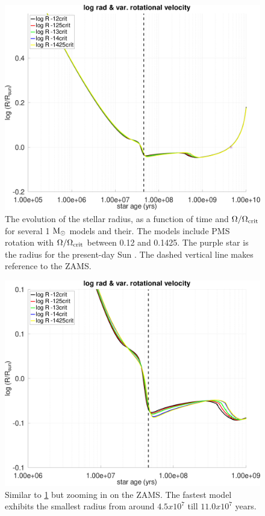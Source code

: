 \documentclass[fleqn,usenatbib]{mnras}
\begin{document}
\begin{ceqn}
\begin{figure}
	\includegraphics[clip,width=\columnwidth]{figures/paper2/lograd_var_vel_g3.pdf}
    \caption{The evolution of the stellar radius, as a function of time and $\Omega / \Omega_{\mathrm{crit}}$ for several 1 $\mathrm{M}_\odot$ models and their. The models include PMS rotation with $\Omega / \Omega_{\mathrm{crit}}$ between 0.12 and 0.1425. The purple star is the radius for the present-day Sun \citep{Gill2012}. The dashed vertical line makes reference to the ZAMS.}
    \label{fig:lograd_var_vel_g3}
\end{figure}

\begin{figure}
	\includegraphics[clip,width=\columnwidth]{figures/paper2/lograd_var_vel_g_z13.pdf}
    \caption{Similar to \ref{fig:lograd_var_vel_g3} but zooming in on the ZAMS. The fastest model exhibits the smallest radius from around $4.5x10^{7}$ till $11.0x10^{7}$ years.}
    \label{fig:lograd_var_vel_g_z13}
\end{figure}


\end{ceqn}
\end{document}
